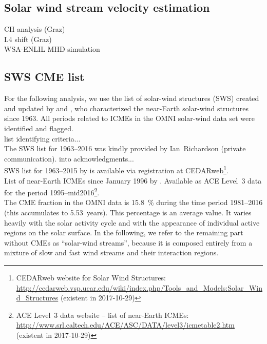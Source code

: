 \subsection{Solar wind stream velocity estimation}
CH analysis (Graz)\\
L4 shift (Graz)\\
WSA-ENLIL MHD simulation\\

\subsection{SWS CME list}
For the following analysis, we use the list of solar-wind structures (SWS) created and updated by \citet{Richardson2000} and \citet{Richardson2012}, who characterized the near-Earth solar-wind structures since 1963. All periods related to ICMEs in the OMNI solar-wind data set were identified and flagged.\\

list identifying criteria...\\

The SWS list for 1963--2016 was kindly provided by Ian~Richardson (private communication). into acknowledgments...\\

SWS list for 1963--2015 by \citep{Richardson2000,Richardson2012} is available via registration at CEDARweb\footnote{CEDARweb website for Solar Wind Structures: \url{http://cedarweb.vsp.ucar.edu/wiki/index.php/Tools_and_Models:Solar_Wind_Structures} (existent in 2017-10-29)}.\\
List of near-Earth ICMEs since January 1996 by \citet{Cane2003,Richardson2010}. Available as ACE Level~3 data for the period 1995--mid2016\footnote{ACE Level~3 data website -- list of near-Earth ICMEs: \url{http://www.srl.caltech.edu/ACE/ASC/DATA/level3/icmetable2.htm} (existent in 2017-10-29)}.\\

The CME fraction in the OMNI data is \SI{15.8}{\%} during the time period 1981--2016 (this accumulates to 5.53~years).
This percentage is an average value. It varies heavily with the solar activity cycle and with the appearance of individual active regions on the solar surface. In the following, we refer to the remaining part without CMEs as ``solar-wind streams'', because it is composed entirely from a mixture of slow and fast wind streams and their interaction regions.

